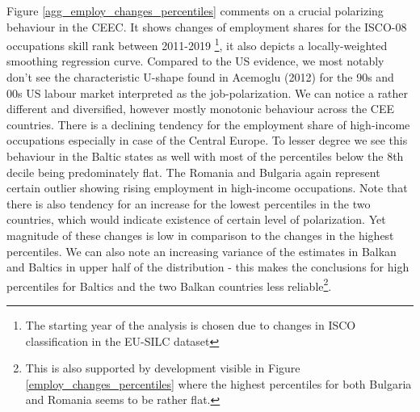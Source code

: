 \documentclass{article}
\begin{document}
Figure \ref{agg_employ_changes_percentiles} comments on a crucial polarizing behaviour in the CEEC. It shows changes of employment shares for the ISCO-08 occupations skill rank between 2011-2019 \footnote{The starting year of the analysis is chosen due to changes in ISCO classification in the EU-SILC dataset}, it also depicts a locally-weighted smoothing regression curve. Compared to the US evidence, we most notably don't see the characteristic U-shape found in Acemoglu (2012) for the 90s and 00s US labour market interpreted as the job-polarization. We can notice a rather different and diversified, however mostly monotonic behaviour across the CEE countries. There is a declining tendency for the employment share of high-income occupations especially in case of the Central Europe. To lesser degree we see this behaviour in the Baltic states as well with most of the percentiles below the 8th decile being predominately flat. The Romania and Bulgaria again represent certain outlier showing rising employment in high-income occupations. Note that there is also tendency for an increase for the lowest percentiles in the two countries, which would indicate existence of certain level of polarization. Yet magnitude of these changes is low in comparison to the changes in the highest percentiles. We can also note an increasing variance of the estimates in Balkan and Baltics in upper half of the distribution - this makes the conclusions for high percentiles for Baltics and the two Balkan countries less reliable\footnote{This is also supported by development visible in Figure \ref{employ_changes_percentiles} where the highest percentiles for both Bulgaria and Romania seems to be rather flat.}.\\
\end{document}
